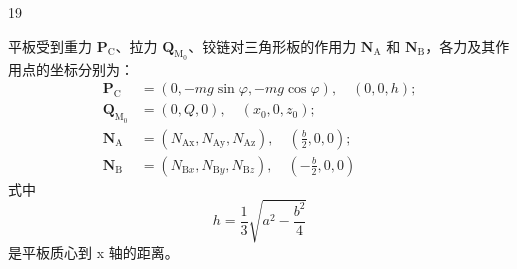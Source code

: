 \begin{solution}{19}
    \begin{subsolution}
        平板受到重力 $\boldsymbol{P}_{\mathrm{C}}$、拉力 $\boldsymbol{Q}_{\mathrm{M}_0}$、铰链对三角形板的作用力 $\boldsymbol{N}_{\mathrm{A}}$ 和 $\boldsymbol{N}_{\mathrm{B}}$，各力及其作用点的坐标分别为：
        \begin{align*}
            \boldsymbol{P}_{\mathrm{C}} &= (0, -mg\sin\varphi, -mg\cos\varphi), \quad (0, 0, h); \\
            \boldsymbol{Q}_{\mathrm{M}_0} &= (0, Q, 0), \quad (x_0, 0, z_0); \\
            \boldsymbol{N}_{\mathrm{A}} &= (N_{\mathrm{Ax}}, N_{\mathrm{Ay}}, N_{\mathrm{Az}}), \quad \left(\frac{b}{2}, 0, 0\right); \\
            \boldsymbol{N}_{\mathrm{B}} &= (N_{\mathrm{B}x}, N_{\mathrm{B}y}, N_{\mathrm{B}z}), \quad \left(-\frac{b}{2}, 0, 0\right)
        \end{align*}
        式中
        \begin{equation*}
            h = \frac{1}{3}\sqrt{a^2 - \frac{b^2}{4}}
        \end{equation*}
        是平板质心到 x 轴的距离。


\end{subsolution}
\end{solution}
